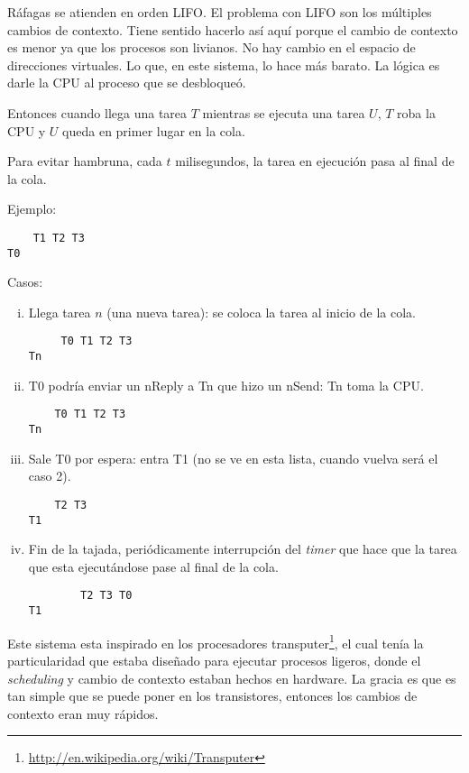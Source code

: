 Ráfagas se atienden en orden LIFO. El problema con LIFO son los múltiples cambios de contexto. Tiene sentido hacerlo así aquí porque el cambio de contexto es menor ya que los procesos son livianos. No hay cambio en el espacio de direcciones virtuales. Lo que, en este sistema, lo hace más barato. La lógica es darle la CPU al proceso que se desbloqueó.

Entonces cuando llega una tarea $T$ mientras se ejecuta una tarea $U$, $T$ roba la CPU y $U$ queda en primer lugar en la cola.

Para evitar hambruna, cada $t$ milisegundos, la tarea en ejecución pasa al final de la cola.

Ejemplo:
\begin{verbatim}
    T1 T2 T3
T0
\end{verbatim}

Casos:
\begin{enumerate}[i.]
\item Llega tarea $n$ (una nueva tarea): se coloca la tarea al inicio de la cola.
\begin{verbatim}
     T0 T1 T2 T3
Tn
\end{verbatim}

\item T0 podría enviar un nReply a Tn que hizo un nSend: Tn toma la CPU.
\begin{verbatim}
    T0 T1 T2 T3
Tn
\end{verbatim}

\item Sale T0 por espera: entra T1 (no se ve en esta lista, cuando vuelva será el caso 2).
\begin{verbatim}
    T2 T3
T1
\end{verbatim}

\item Fin de la tajada, periódicamente interrupción del \textit{timer} que hace que la tarea que esta ejecutándose pase al final de la cola.
\begin{verbatim}
		T2 T3 T0
T1
\end{verbatim}
\end{enumerate}

Este sistema esta inspirado en los procesadores transputer\footnote{\url{http://en.wikipedia.org/wiki/Transputer}}, el cual tenía la particularidad que estaba diseñado para ejecutar procesos ligeros, donde el \textit{scheduling} y cambio de contexto estaban hechos en hardware. La gracia es que es tan simple que se puede poner en los transistores, entonces los cambios de contexto eran muy rápidos.

